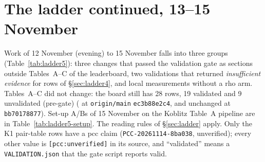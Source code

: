 \section{The ladder continued, 13--15 November}\label{sec:ladder5}

Work of 12 November (evening) to 15 November falls into three groups
(Table~\ref{tab:ladder5}): three changes that passed the validation gate
as sections outside Tables~A--C of the leaderboard, two validations that
returned \emph{insufficient evidence} for rows of \S\ref{sec:ladder4}, and
local measurements without a rho arm. Tables~A--C did not change: the board
still has 28 rows, 19 validated and 9 unvalidated (pre-gate)
( at \texttt{origin/main}
\texttt{ec3b88e2c4}, and unchanged at \texttt{bb70178877}). Set-up A/Bs of
15 November on the Koblitz Table~A pipeline are in
Table~\ref{tab:ladder5-setup}. The reading rules of \S\ref{sec:ladder} apply. Only
the K1 pair-table rows have a pcc claim (\texttt{PCC-20261114-8ba038},
unverified); every other value is \texttt{[pcc:unverified]} in its
source, and ``validated'' means a \texttt{VALIDATION.json} that the gate
script reports valid.

